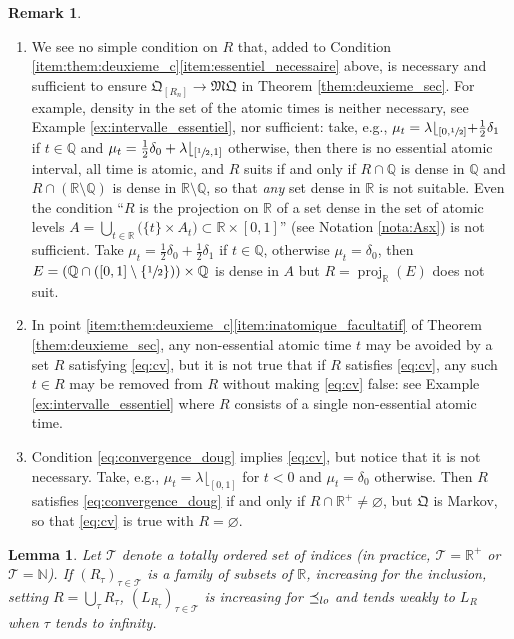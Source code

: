 \documentclass[11pt]{article}
\newcommand{\skpt}{\smallskip}
\theoremstyle{plain}
\newtheorem{lem}[them]{Lemma}
\theoremstyle{definition}
\newtheorem{rem}[them]{Remark}
\newcommand{\como}{\mathfrak{Q}}
\newcommand{\mq}{\mathfrak{MQ}}
\newcommand{\Tt}{{\mathcal T}}
\newcommand{\la}{\lambda}
\newcommand{\R}{\mathbb{R}}
\newcommand{\Q}{\mathbb{Q}}
\newcommand{\N}{\mathbb{N}}
\newcommand{\pr}{\operatorname{proj}}
\newcommand{\leqlc}{\preceq_{\rm lo}}
\begin{document}
\skpt
\begin{rem}
\begin{enumerate}
\item
We see no simple condition on $R$ that, added to Condition \eqref{item:them:deuxieme_c}\eqref{item:essentiel_necessaire} above, is necessary and sufficient to ensure $\como_{[R_n]}\to\mq$ in Theorem \ref{them:deuxieme_sec}. For example, density in the set of the atomic times is neither necessary, see Example \ref{ex:intervalle_essentiel}, nor sufficient: take, e.g., $\mu_t=\la\lfloor_{[0,\sfrac12]}+\frac12\delta_1$ if $t\in\Q$ and $\mu_t=\frac12\delta_0+\la\lfloor_{[\sfrac12,1]}$ otherwise, then there is no essential atomic interval, all time is atomic, and $R$ suits if and only if $R\cap\Q$ is dense in $\Q$ and $R\cap(\R\setminus\Q)$ is dense in $\R\setminus\Q$, so that \emph{any}\/ set dense in $\R$ is not suitable. Even the condition ``$R$ is the projection on $\R$ of a set dense in the set of atomic levels $A=\bigcup_{t\in\R}\big(\{t\}\times A_t\bigr)\subset\R\times [0,1]$'' (see Notation \ref{nota:Asx}) is not sufficient. Take $\mu_t=\frac12\delta_0+\frac12\delta_1$ if $t\in\Q$, otherwise $\mu_t=\delta_0$, then $E=(\Q\cap([0,1]\setminus\{\sfrac12\}))\times\Q$ is dense in $A$ but $R=\pr_{\R}(E)$ does not suit.

\item
In point \eqref{item:them:deuxieme_c}\eqref{item:inatomique_facultatif} of Theorem \ref{them:deuxieme_sec}, any non-essential atomic time $t$ may be avoided by a set $R$ satisfying \eqref{eq:cv}, but it is not true that if $R$ satisfies \eqref{eq:cv}, any such $t\in R$ may be removed from $R$ without making \eqref{eq:cv} false: see Example \ref{ex:intervalle_essentiel} where $R$ consists of a single non-essential atomic time.

\item
Condition \eqref{eq:convergence_doug} implies \eqref{eq:cv}, but notice that it is not necessary. Take, e.g., $\mu_t=\la\lfloor_{[0,1]}$ for $t<0$ and $\mu_t=\delta_0$ otherwise. Then $R$ satisfies \eqref{eq:convergence_doug} if and only if $R\cap \R^+\neq\varnothing$, but $\como$ is Markov, so that \eqref{eq:cv} is true with $R=\varnothing$.
\end{enumerate}
\end{rem}

\begin{lem}\label{lem:croissance_lc} Let $\Tt$ denote a totally ordered set of indices (in practice, $\Tt=\R^+$ or $\Tt=\N$). If $(R_\tau)_{\tau\in \Tt}$ is a family of subsets of\/ $\R$, increasing for the inclusion, setting $R=\bigcup_\tau R_\tau$, $(L_{R_\tau})_{\tau\in\Tt}$ is increasing for $\leqlc$ and tends weakly to $L_{R}$ when $\tau$ tends to infinity.
\end{lem}
\end{document}
